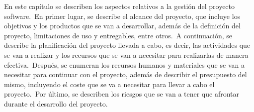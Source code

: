 
En este capítulo se describen los aspectos relativos a la gestión del proyecto software.\ En primer lugar,
se describe el alcance del proyecto, que incluye los objetivos y los productos que se van a desarrollar,
además de la definición del proyecto, limitaciones de uso y entregables, entre otros.\ A
continuación, se describe la planificación del proyecto llevada a cabo, es decir, las actividades que se van a realizar y los recursos que se van a necesitar
para realizarlas de manera efectiva.\ Después, se enumeran los recursos humanos y materiales que se van a necesitar para
continuar con el proyecto, además de describir el presupuesto del mismo, incluyendo el coste que se va a
necesitar para llevar a cabo el proyecto.\ Por último, se describen los riesgos que se van a tener que afrontar durante
el desarrollo del proyecto.






